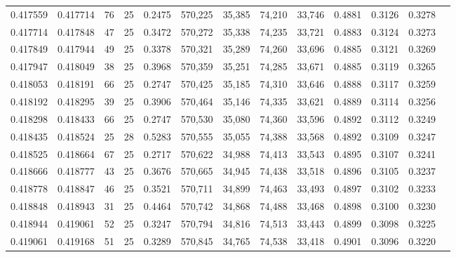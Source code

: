 \begin{tabular}{rrrrrrrrrrrrr}
0.417559 & 0.417714 &    76 &  25 &                                     0.2475 & 570,225 &  35,385 &  74,210 &  33,746 & 0.4881 & 0.3126 & 0.3278 \\
0.417714 & 0.417848 &    47 &  25 &                                     0.3472 & 570,272 &  35,338 &  74,235 &  33,721 & 0.4883 & 0.3124 & 0.3273 \\
0.417849 & 0.417944 &    49 &  25 &                                     0.3378 & 570,321 &  35,289 &  74,260 &  33,696 & 0.4885 & 0.3121 & 0.3269 \\
0.417947 & 0.418049 &    38 &  25 &                                     0.3968 & 570,359 &  35,251 &  74,285 &  33,671 & 0.4885 & 0.3119 & 0.3265 \\
0.418053 & 0.418191 &    66 &  25 &                                     0.2747 & 570,425 &  35,185 &  74,310 &  33,646 & 0.4888 & 0.3117 & 0.3259 \\
0.418192 & 0.418295 &    39 &  25 &                                     0.3906 & 570,464 &  35,146 &  74,335 &  33,621 & 0.4889 & 0.3114 & 0.3256 \\
0.418298 & 0.418433 &    66 &  25 &                                     0.2747 & 570,530 &  35,080 &  74,360 &  33,596 & 0.4892 & 0.3112 & 0.3249 \\
0.418435 & 0.418524 &    25 &  28 &                                     0.5283 & 570,555 &  35,055 &  74,388 &  33,568 & 0.4892 & 0.3109 & 0.3247 \\
0.418525 & 0.418664 &    67 &  25 &                                     0.2717 & 570,622 &  34,988 &  74,413 &  33,543 & 0.4895 & 0.3107 & 0.3241 \\
0.418666 & 0.418777 &    43 &  25 &                                     0.3676 & 570,665 &  34,945 &  74,438 &  33,518 & 0.4896 & 0.3105 & 0.3237 \\
0.418778 & 0.418847 &    46 &  25 &                                     0.3521 & 570,711 &  34,899 &  74,463 &  33,493 & 0.4897 & 0.3102 & 0.3233 \\
0.418848 & 0.418943 &    31 &  25 &                                     0.4464 & 570,742 &  34,868 &  74,488 &  33,468 & 0.4898 & 0.3100 & 0.3230 \\
0.418944 & 0.419061 &    52 &  25 &                                     0.3247 & 570,794 &  34,816 &  74,513 &  33,443 & 0.4899 & 0.3098 & 0.3225 \\
0.419061 & 0.419168 &    51 &  25 &                                     0.3289 & 570,845 &  34,765 &  74,538 &  33,418 & 0.4901 & 0.3096 & 0.3220 \\

\end{tabular}
